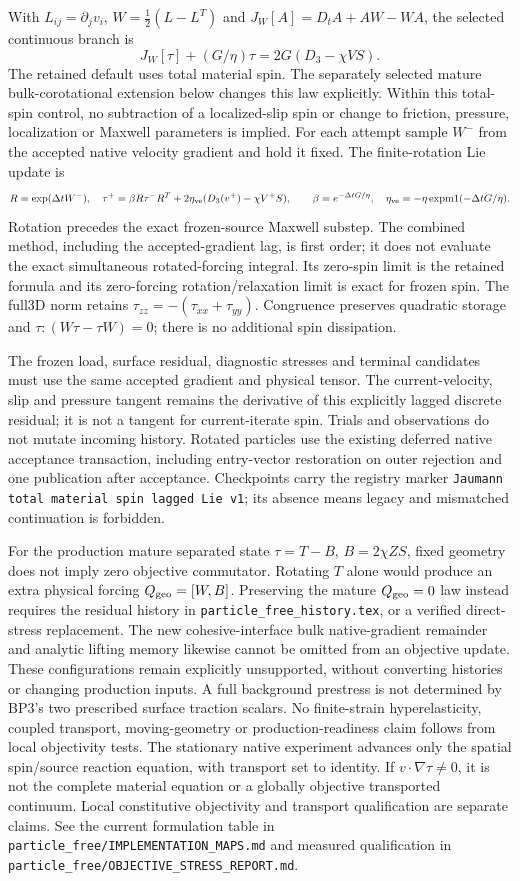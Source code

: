 \documentclass[11pt]{article}
\begin{document}
With $L_{ij}=\partial_j v_i$, $W=\tfrac12(L-L^T)$ and
$J_W[A]=D_tA+AW-WA$, the selected continuous branch is
\[
 J_W[\tau]+(G/\eta)\tau=2G(D_3-\chi V S).
\]
The retained default uses total material spin. The separately selected mature
bulk-corotational extension below changes this law explicitly. Within this
total-spin control, no subtraction of a localized-slip spin or
change to friction, pressure, localization or Maxwell parameters is implied.
For each attempt sample $W^-$ from the accepted native velocity gradient and
hold it fixed. The finite-rotation Lie update is
\[
 R=\exp(\Delta t W^-),\quad
 \tau^+=\beta R\tau^-R^T+2\eta_{\rm ve}(D_3(v^+)-\chi V^+S),\qquad
 \beta=e^{-\Delta tG/\eta},\quad
 \eta_{\rm ve}=-\eta\operatorname{expm1}(-\Delta tG/\eta).
\]
Rotation precedes the exact frozen-source Maxwell substep. The combined method,
including the accepted-gradient lag, is first order; it does not evaluate the
exact simultaneous rotated-forcing integral. Its zero-spin limit is the retained
formula and its zero-forcing rotation/relaxation limit is exact for frozen spin.
The full3D norm retains $\tau_{zz}=-(\tau_{xx}+\tau_{yy})$.
Congruence preserves quadratic storage and
$\tau:(W\tau-\tau W)=0$; there is no additional spin dissipation.

The frozen load, surface residual, diagnostic stresses and terminal candidates
must use the same accepted gradient and physical tensor. The current-velocity,
slip and pressure tangent remains the derivative of this explicitly lagged
discrete residual; it is not a tangent for current-iterate spin. Trials and
observations do not mutate incoming history. Rotated particles use the existing
deferred native acceptance transaction, including entry-vector restoration on
outer rejection and one publication after acceptance. Checkpoints carry the
registry marker \texttt{Jaumann total material spin lagged Lie v1}; its absence
means legacy and mismatched continuation is forbidden.

For the production mature separated state $\tau=T-B$, $B=2\chi ZS$, fixed
geometry does not imply zero objective commutator. Rotating $T$ alone would
produce an extra physical forcing $Q_{\rm geo}=[W,B]$. Preserving the mature
$Q_{\rm geo}=0$ law instead requires the residual history in
\texttt{particle\_free\_history.tex}, or a verified direct-stress replacement.
The new cohesive-interface bulk native-gradient remainder and analytic lifting
memory likewise cannot be omitted from an objective update. These configurations
remain explicitly unsupported, without converting histories or changing
production inputs. A full background prestress is not determined by BP3's two
prescribed surface traction scalars. No finite-strain hyperelasticity, coupled
transport, moving-geometry or production-readiness claim follows from local
objectivity tests.
The stationary native experiment advances only the spatial spin/source reaction
equation, with transport set to identity. If $v\cdot\nabla\tau\ne0$, it is not
the complete material equation or a globally objective transported continuum.
Local constitutive objectivity and transport qualification are separate claims.
See the current formulation table in
\texttt{particle\_free/IMPLEMENTATION\_MAPS.md} and measured qualification in
\texttt{particle\_free/OBJECTIVE\_STRESS\_REPORT.md}.
\end{document}
